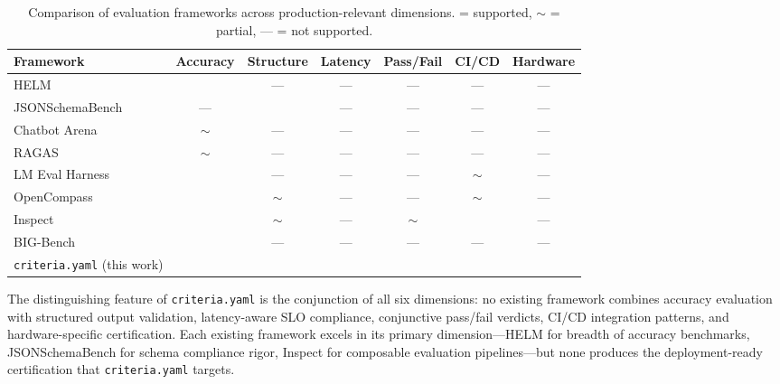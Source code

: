 \documentclass[11pt]{article}
\newcommand{\criteriayaml}{\texttt{criteria.yaml}}
\newcommand{\cmark}{\checkmark}
\newcommand{\pmark}{$\sim$}
\begin{document}
\begin{table}[ht]
\centering
\caption{Comparison of evaluation frameworks across production-relevant dimensions. \cmark{} = supported, \pmark{} = partial, --- = not supported.}
\label{tab:comparison}
\small
\begin{adjustbox}{max width=\linewidth}
\begin{tabular}{lcccccc}
\toprule
\textbf{Framework} & \textbf{Accuracy} & \textbf{Structure} & \textbf{Latency} & \textbf{Pass/Fail} & \textbf{CI/CD} & \textbf{Hardware} \\
\midrule
HELM~\citep{liang2023helm}                & \cmark & ---    & ---    & ---    & ---    & ---    \\
JSONSchemaBench~\citep{geng2025jsonschemabench} & ---    & \cmark & ---    & ---    & ---    & ---    \\
Chatbot Arena~\citep{chiang2024chatbot}    & \pmark & ---    & ---    & ---    & ---    & ---    \\
RAGAS~\citep{es2023ragas}                  & \pmark & ---    & ---    & ---    & ---    & ---    \\
LM Eval Harness~\citep{gao2023lmeval}     & \cmark & ---    & ---    & ---    & \pmark & ---    \\
OpenCompass~\citep{opencompass2023}         & \cmark & \pmark & ---    & ---    & \pmark & ---    \\
Inspect~\citep{ukaisi2024inspect}          & \cmark & \pmark & ---    & \pmark & \cmark & ---    \\
BIG-Bench~\citep{srivastava2023bigbench}   & \cmark & ---    & ---    & ---    & ---    & ---    \\
\midrule
\criteriayaml{} (this work)                & \cmark & \cmark & \cmark & \cmark & \cmark & \cmark \\
\bottomrule
\end{tabular}
\end{adjustbox}
\end{table}

The distinguishing feature of \criteriayaml{} is the conjunction of all six dimensions: no existing framework combines accuracy evaluation with structured output validation, latency-aware SLO compliance, conjunctive pass/fail verdicts, CI/CD integration patterns, and hardware-specific certification. Each existing framework excels in its primary dimension---HELM for breadth of accuracy benchmarks, JSONSchemaBench for schema compliance rigor, Inspect for composable evaluation pipelines---but none produces the deployment-ready certification that \criteriayaml{} targets.
\end{document}
